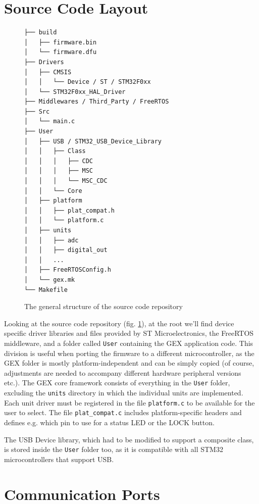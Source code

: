 \section{Source Code Layout}

\begin{figure}
	\scriptsize\vspace{-3em}
	\begin{verbatim}
├── build
│   ├── firmware.bin
│   └── firmware.dfu
├── Drivers
│   ├── CMSIS
│   │   └── Device / ST / STM32F0xx
│   └── STM32F0xx_HAL_Driver
├── Middlewares / Third_Party / FreeRTOS
├── Src
│   └── main.c
├── User
│   ├── USB / STM32_USB_Device_Library
│   │   ├── Class
│   │   │   ├── CDC
│   │   │   ├── MSC
│   │   │   └── MSC_CDC
│   │   └── Core
│   ├── platform
│   │   ├── plat_compat.h
│   │   └── platform.c
│   ├── units
│   │   ├── adc
│   │   ├── digital_out
│   │   ...
│   ├── FreeRTOSConfig.h
│   └── gex.mk
└── Makefile	
	\end{verbatim}
	\vspace{-1em}
	\cprotect\caption{\label{fig:repo-structure} The general structure of the source code repository}
\end{figure}

Looking at the source code repository (fig. \ref{fig:repo-structure}), at the root we'll find device specific driver libraries and files provided by ST Microelectronics, the FreeRTOS middleware, and a folder called \verb|User| containing the GEX application code. This division is useful when porting the firmware to a different microcontroller, as the GEX folder is mostly platform-independent and can be simply copied (of course, adjustments are needed to accompany different hardware peripheral versions etc.). The GEX core framework consists of everything in the \verb|User| folder, excluding the \verb|units| directory in which the individual units are implemented. Each unit driver must be registered in the file \verb|platform.c| to be available for the user to select. The file \verb|plat_compat.c| includes platform-specific headers and defines e.g. which pin to use for a status LED or the LOCK button.

The USB Device library, which had to be modified to support a composite class, is stored inside the \verb|User| folder too, as it is compatible with all STM32 microcontrollers that support USB.


\section{Communication Ports} \label{sec:com-ports}

